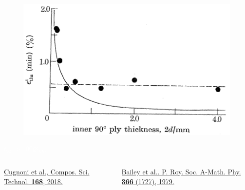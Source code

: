 \documentclass[first,firstsupp,lastsupp,last,hyperref,table]{ETHclass}
\begin{document}
\begin{frame}
\begin{columns}[c]
\begin{column}{0.5\textwidth}
\centering
\begin{figure}
\centering
\includegraphics[width=\columnwidth]{bailey.png}
\end{figure}
\textcolor{white}{\tiny$t_{90^{\circ}}>100\diameter_{fiber}$}
\end{column}
\end{columns}
\vspace{0.15cm}
\begin{columns}[b]
\begin{column}{0.5\textwidth}
\centering
\pgfmathsetmacro{}
\pgfmathsetmacro{}
{\fontsize{\fontsizeref}{\stretchref} \selectfont \href{https://doi.org/10.1016/j.compscitech.2018.08.037}{Cugnoni et al., Compos. Sci. Technol. \textbf{168}, 2018.}}
\end{column}
\begin{column}{0.5\textwidth}
\centering
\pgfmathsetmacro{}
\pgfmathsetmacro{}
{\fontsize{\fontsizeref}{\stretchref} \selectfont \href{https://doi.org/10.1098/rspa.1979.0071}{Bailey et al., P. Roy. Soc. A-Math. Phy. \textbf{366} (1727), 1979.}}
\end{column}
\end{columns}
\end{frame}

\addtocounter{framenumber}{-1}
\end{document}
